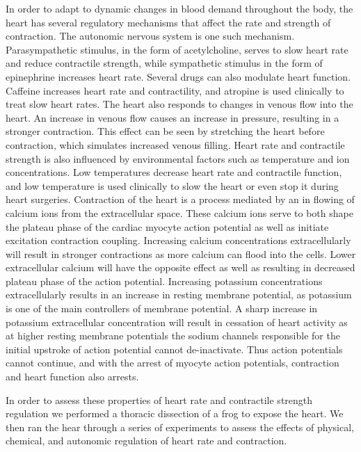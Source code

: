\documentclass[12pt]{article}
\begin{document}
\par{}
In order to adapt to dynamic changes in blood demand throughout the body, the heart has several regulatory mechanisms that affect the rate and strength of contraction. The autonomic nervous system is one such mechanism. Parasympathetic stimulus, in the form of acetylcholine, serves to slow heart rate and reduce contractile strength, while sympathetic stimulus in the form of epinephrine increases heart rate. Several drugs can also modulate heart function. Caffeine increases heart rate and contractility, and atropine is used clinically to treat slow heart rates. The heart also responds to changes in venous flow into the heart. An increase in venous flow causes an increase in pressure, resulting in a stronger contraction. This effect can be seen by stretching the heart before contraction, which simulates increased venous filling. Heart rate and contractile strength is also influenced by environmental factors such as temperature and ion concentrations. Low temperatures decrease heart rate and contractile function, and low temperature is used clinically to slow the heart or even stop it during heart surgeries. Contraction of the heart is a process mediated by an in flowing of calcium ions from the extracellular space. These calcium ions serve to both shape the plateau phase of the cardiac myocyte action potential as well as initiate excitation contraction coupling. Increasing calcium concentrations extracellularly will result in stronger contractions as more calcium can flood into the cells. Lower extracellular calcium will have the opposite effect as well as resulting in decreased plateau phase of the action potential. Increasing potassium concentrations extracellularly results in an increase in resting membrane potential, as potassium is one of the main controllers of membrane potential. A sharp increase in potassium extracellular concentration will result in cessation of heart activity as at higher resting membrane potentials the sodium channels responsible for the initial upstroke of action potential cannot de-inactivate. Thus action potentials cannot continue, and with the arrest of myocyte action potentials, contraction and heart function also arrests.\cite{McMichael2007}\cite{Green1996}\cite{Tyson2011}

\par{}
In order to assess these properties of heart rate and contractile strength regulation we performed a thoracic dissection of a frog to expose the heart. We then ran the hear through a series of experiments to assess the effects of physical, chemical, and autonomic regulation of heart rate and contraction.
\end{document}
